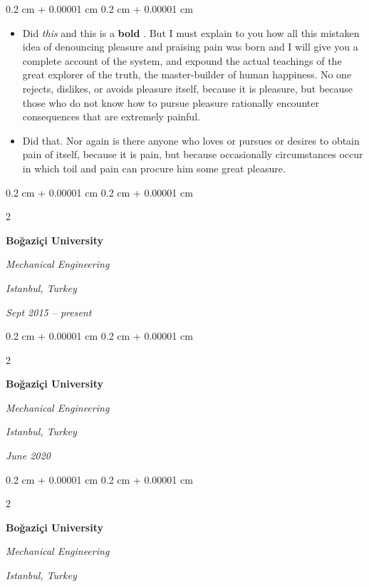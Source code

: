 \documentclass[10pt, letterpaper]{article}
\newenvironment{highlights}{
    \begin{itemize}[
        topsep=0.10 cm,
        parsep=0.10 cm,
        partopsep=0pt,
        itemsep=0pt,
        leftmargin=0.4 cm + 10pt
    ]
}{
    \end{itemize}
} %
\newenvironment{onecolentry}{
    \begin{adjustwidth}{
        0.2 cm + 0.00001 cm
    }{
        0.2 cm + 0.00001 cm
    }
}{
    \end{adjustwidth}
} %
\newenvironment{twocolentry}[2][]{
    \onecolentry
    \def\secondColumn{#2}
    \setcolumnwidth{\fill, 4.5 cm}
    \begin{paracol}{2}
}{
    \switchcolumn \raggedleft \secondColumn
    \end{paracol}
    \endonecolentry
} %
\let\hrefWithoutArrow\href
\renewcommand{\href}[2]{\hrefWithoutArrow{#1}{\ifthenelse{\equal{#2}{}}{ }{#2 }\raisebox{.15ex}{\footnotesize \faExternalLink*}}}
\begin{document}
        \vspace{0.10 cm}
        \begin{onecolentry}
            \begin{highlights}
                \item Did \textit{this} and this is a \textbf{bold} \href{https://example.com}{link}. But I must explain to you how all this mistaken idea of denouncing pleasure and praising pain was born and I will give you a complete account of the system, and expound the actual teachings of the great explorer of the truth, the master-builder of human happiness. No one rejects, dislikes, or avoids pleasure itself, because it is pleasure, but because those who do not know how to pursue pleasure rationally encounter consequences that are extremely painful.
                \item Did that. Nor again is there anyone who loves or pursues or desires to obtain pain of itself, because it is pain, but because occasionally circumstances occur in which toil and pain can procure him some great pleasure.
            \end{highlights}
        \end{onecolentry}


        \vspace{0.2 cm}

        \begin{twocolentry}{
        \textit{Istanbul, Turkey}    
            
        \textit{Sept 2015 – present}}
            \textbf{Boğaziçi University}

            \textit{Mechanical Engineering}
        \end{twocolentry}



        \vspace{0.2 cm}

        \begin{twocolentry}{
        \textit{Istanbul, Turkey}    
            
        \textit{June 2020}}
            \textbf{Boğaziçi University}

            \textit{Mechanical Engineering}
        \end{twocolentry}



        \vspace{0.2 cm}

        \begin{twocolentry}{
        \textit{Istanbul, Turkey}    
            
        }
            \textbf{Boğaziçi University}

            \textit{Mechanical Engineering}
        \end{twocolentry}
\end{document}
